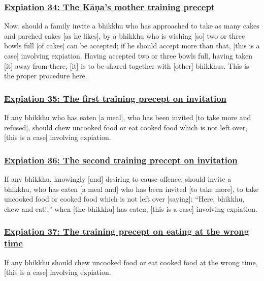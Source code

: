 \subsubsection*{\hyperref[pac34]{Expiation 34: The Kāṇa's mother training precept}}
\label{exp34}
Now, should a family invite a bhikkhu who has approached to take as many cakes and parched cakes [as he likes], by a bhikkhu who is wishing [so] two or three bowls full [of cakes] can be accepted; if he should accept more than that, [this is a case] involving expiation. Having accepted two or three bowls full, having taken [it] away from there, [it] is to be shared together with [other] bhikkhus. This is the proper procedure here.



\subsubsection*{\hyperref[pac35]{Expiation 35: The first training precept on invitation}}
\label{exp35}
If any bhikkhu who has eaten [a meal], who has been invited [to take more and refused], should chew uncooked food or eat cooked food which is not left over, [this is a case] involving expiation.



\subsubsection*{\hyperref[pac36]{Expiation 36: The second training precept on invitation}}
\label{exp36}
If any bhikkhu, knowingly [and] desiring to cause offence, should invite a bhikkhu, who has eaten [a meal and] who has been invited [to take more], to take uncooked food or cooked food which is not left over [saying]: ``Here, bhikkhu, chew and eat!,'' when [the bhikkhu] has eaten, [this is a case] involving expiation.



\subsubsection*{\hyperref[pac37]{Expiation 37: The training precept on eating at the wrong time}}
\label{exp37}
If any bhikkhu should chew uncooked food or eat cooked food at the wrong time, [this is a case] involving expiation.



